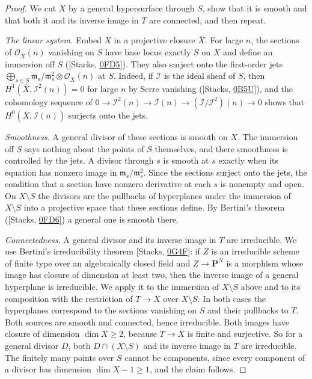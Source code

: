 \documentclass[11pt]{article}
\begin{document}
\begin{proof}[{Proof}]\label{bp12}%
We cut \(X\) by a general hypersurface through \(S\), show that it is smooth and that both it and its inverse image in \(T\) are connected, and then repeat.

\emph{The linear system.} Embed \(X\) in a projective closure \(\overline X\). For large \(n\), the sections of \(\mathcal O_{\overline X}(n)\) vanishing on \(S\) have base locus exactly \(S\) on \(X\) and define an immersion off \(S\) ([Stacks, \href{https://stacks.math.columbia.edu/tag/0FD5}{0FD5}]). They also surject onto the first-order jets \(\bigoplus_{s\in S}\mathfrak m_s/\mathfrak m_s^2\otimes
\mathcal O_{\overline X}(n)\) at \(S\). Indeed, if \(\mathcal I\) is the ideal sheaf of \(S\), then \(H^1(\overline X,\mathcal I^2(n))=0\) for large \(n\) by Serre vanishing ([Stacks, \href{https://stacks.math.columbia.edu/tag/0B5U}{0B5U}]), and the cohomology sequence of \(0\to\mathcal I^2(n)\to\mathcal I(n)\to(\mathcal I/\mathcal I^2)(n)\to0\) shows that \(H^0(\overline X,\mathcal I(n))\) surjects onto the jets.

\emph{Smoothness.} A general divisor of these sections is smooth on \(X\). The immersion off \(S\) says nothing about the points of \(S\) themselves, and there smoothness is controlled by the jets. A divisor through \(s\) is smooth at \(s\) exactly when its equation has nonzero image in \(\mathfrak m_s/\mathfrak m_s^2\). Since the sections surject onto the jets, the condition that a section have nonzero derivative at each \(s\) is nonempty and open. On \(X\setminus S\) the divisors are the pullbacks of hyperplanes under the immersion of \(X\setminus S\) into a projective space that these sections define. By Bertini's theorem ([Stacks, \href{https://stacks.math.columbia.edu/tag/0FD6}{0FD6}]) a general one is smooth there.

\emph{Connectedness.} A general divisor and its inverse image in \(T\) are irreducible. We use Bertini's irreducibility theorem [Stacks, \href{https://stacks.math.columbia.edu/tag/0G4F}{0G4F}]: if \(Z\) is an irreducible scheme of finite type over an algebraically closed field and \(Z\to\mathbf P^N\) is a morphism whose image has closure of dimension at least two, then the inverse image of a general hyperplane is irreducible. We apply it to the immersion of \(X\setminus S\) above and to its composition with the restriction of \(T\to X\) over \(X\setminus S\). In both cases the hyperplanes correspond to the sections vanishing on \(S\) and their pullbacks to \(T\). Both sources are smooth and connected, hence irreducible. Both images have closure of dimension \(\dim X\ge2\), because \(T\to X\) is finite and surjective. So for a general divisor \(D\), both \(D\cap(X\setminus S)\) and its inverse image in \(T\) are irreducible. The finitely many points over \(S\) cannot be components, since every component of a divisor has dimension \(\dim X-1\ge1\), and the claim follows.


\end{proof}
\end{document}
